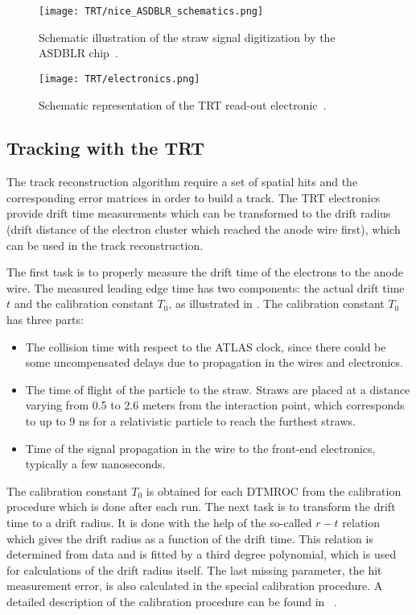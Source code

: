 \begin{figure}
\centering
\texttt{[image: TRT/nice\_ASDBLR\_schematics.png]}
\caption{ 
 Schematic illustration of the straw signal digitization by the ASDBLR chip~\cite{Aad:2008zzm}.
}
\label{fig:nice_asdblr_schematics}
\end{figure}


\begin{figure}
\centering
\texttt{[image: TRT/electronics.png]}
\caption{ 
 Schematic representation of the TRT read-out electronic~\cite{TRT_electronics}.
}
\label{fig:electronics}
\end{figure}



\subsection{Tracking with the TRT}
\label{subsec:tracking_with_trt}

The track reconstruction algorithm require a set of spatial hits and the corresponding error matrices in order to build a track. The TRT electronics provide drift time measurements which can be transformed to the
drift radius (drift distance of the electron cluster which reached the anode wire first), which can be used in the track reconstruction.

The first task is to properly measure the drift time of the electrons to the anode wire. 
The measured leading edge time has two components: the actual drift time $t$ and the calibration constant $T_{0}$, as illustrated in .
The calibration constant $T_{0}$ has three parts:
\begin{itemize}
 \item The collision time with respect to the ATLAS clock, since there could be some uncompensated delays due to propagation in the wires and electronics.
 \item The time of flight of the particle to the straw. Straws are placed at a distance varying from 0.5 to 2.6 meters from the interaction point, 
 which corresponds to up to 9 ns for a relativistic particle to reach the furthest straws.
 \item Time of the signal propagation in the wire to the front-end electronics, typically a few nanoseconds.
\end{itemize}
The calibration constant $T_{0}$ is obtained for each DTMROC from the calibration procedure which is done after each run.
The next task is to transform the drift time to a drift radius. It is done with the help of the so-called $r-t$ relation which gives the drift radius as a function of the drift time.
This relation is determined from data and is fitted by a third degree polynomial, which is used for calculations of the drift radius itself.
The last missing parameter, the hit measurement error, is also calculated in the special calibration procedure. A detailed description of the calibration procedure
can be found in ~\cite{alonso_thesis}.

